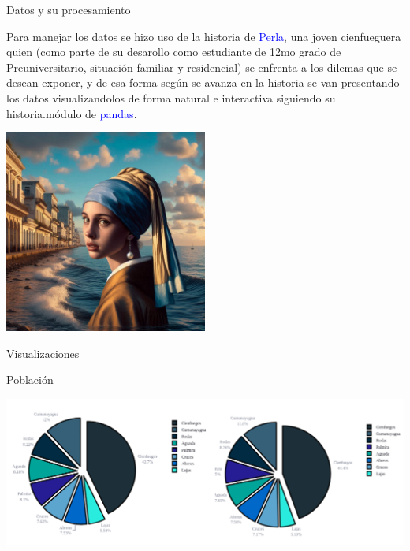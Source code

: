 \documentclass{beamer}
\begin{document}
\begin{frame}
    \begin{block}{Datos y su procesamiento}
        \begin{itemize}
            Para manejar los datos se hizo uso de la historia de \textcolor{blue}{Perla}, una joven cienfueguera quien (como parte de su desarollo como estudiante de 12mo grado de Preuniversitario, situación familiar y residencial) se enfrenta a los dilemas que se desean exponer, y de esa forma según se avanza en la historia se van presentando los datos visualizandolos de forma natural e interactiva siguiendo su historia.módulo de \textcolor{blue}{pandas}.
        \end{itemize}
    \end{block}

    \begin{center}
        \includegraphics[width=0.5\textwidth]{img/perla4.jpeg}
    \end{center}
\end{frame}
\begin{frame}{Visualizaciones}
    \begin{block}{Población}
    \begin{center}
        \includegraphics[width=1.0\textwidth]{img/fig1.png}
    \end{center}
    \end{block}
\end{frame}
\end{document}
